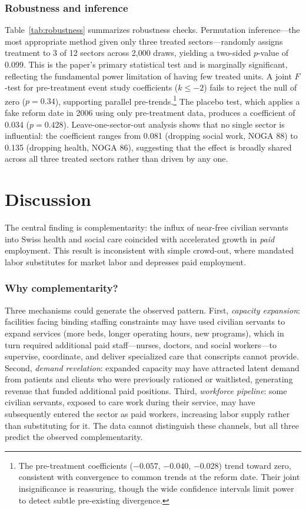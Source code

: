 \documentclass[12pt]{article}
\begin{document}
\subsubsection*{Robustness and inference} Table~\ref{tab:robustness} summarizes robustness checks. Permutation inference---the most appropriate method given only three treated sectors---randomly assigns treatment to 3 of 12 sectors across 2,000 draws, yielding a two-sided $p$-value of 0.099. This is the paper's primary statistical test and is marginally significant, reflecting the fundamental power limitation of having few treated units. A joint $F$-test for pre-treatment event study coefficients ($k \leq -2$) fails to reject the null of zero ($p = 0.34$), supporting parallel pre-trends.\footnote{The pre-treatment coefficients ($-0.057$, $-0.040$, $-0.028$) trend toward zero, consistent with convergence to common trends at the reform date. Their joint insignificance is reassuring, though the wide confidence intervals limit power to detect subtle pre-existing divergence.} The placebo test, which applies a fake reform date in 2006 using only pre-treatment data, produces a coefficient of 0.034 ($p = 0.428$). Leave-one-sector-out analysis shows that no single sector is influential: the coefficient ranges from 0.081 (dropping social work, NOGA 88) to 0.135 (dropping health, NOGA 86), suggesting that the effect is broadly shared across all three treated sectors rather than driven by any one.



\section{Discussion}

The central finding is complementarity: the influx of near-free civilian servants into Swiss health and social care coincided with accelerated growth in \textit{paid} employment. This result is inconsistent with simple crowd-out, where mandated labor substitutes for market labor and depresses paid employment.

\subsubsection*{Why complementarity?} Three mechanisms could generate the observed pattern. First, \textit{capacity expansion}: facilities facing binding staffing constraints may have used civilian servants to expand services (more beds, longer operating hours, new programs), which in turn required additional paid staff---nurses, doctors, and social workers---to supervise, coordinate, and deliver specialized care that conscripts cannot provide. Second, \textit{demand revelation}: expanded capacity may have attracted latent demand from patients and clients who were previously rationed or waitlisted, generating revenue that funded additional paid positions. Third, \textit{workforce pipeline}: some civilian servants, exposed to care work during their service, may have subsequently entered the sector as paid workers, increasing labor supply rather than substituting for it. The data cannot distinguish these channels, but all three predict the observed complementarity.
\end{document}
